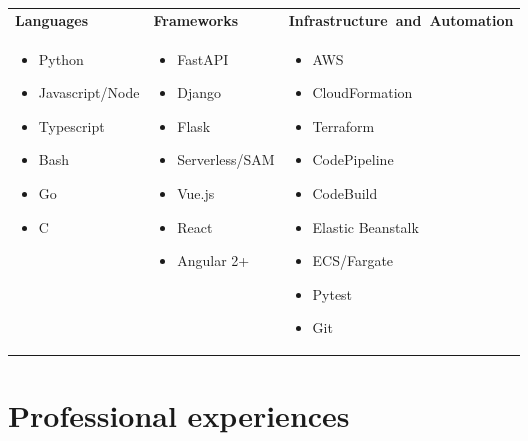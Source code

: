 \documentclass[letterpaper]{twentysecondcv} %
\begin{document}
\begin{tabular}{ p{4cm} p{4cm} p{5cm}}
    \textbf{Languages} & \textbf{Frameworks} & \textbf{Infrastructure~and~Automation} \\
    
    \begin{itemize}
      \item Python 
      \item Javascript/Node
      \item Typescript 
      \item Bash 
      \item Go
      \item C 
    \end{itemize}  &
    \begin{itemize}
      \item FastAPI
      \item Django
      \item Flask 
      \item Serverless/SAM
      \item Vue.js 
      \item React 
      \item Angular 2+ 
    \end{itemize} &
    \begin{itemize}
      \item AWS 
      \item CloudFormation 
      \item Terraform
      \item CodePipeline
      \item CodeBuild
      \item Elastic Beanstalk
      \item ECS/Fargate
      \item Pytest
      \item Git 
    \end{itemize} \\
\end{tabular}

\vspace{-0.9cm}


\section{Professional experiences}
\end{document}

